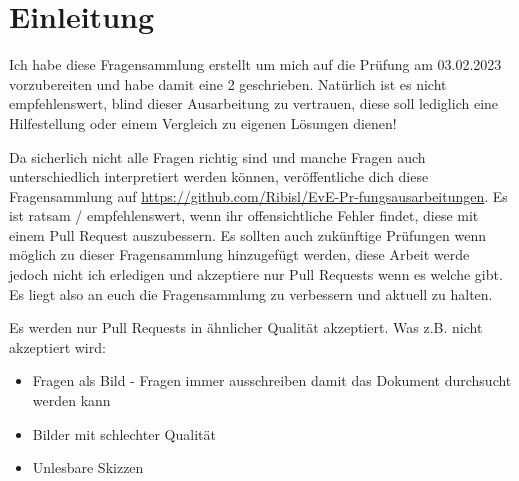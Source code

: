\section{Einleitung}
Ich habe diese Fragensammlung erstellt um mich auf die Prüfung am 03.02.2023 vorzubereiten und habe damit eine 2 geschrieben. 
Natürlich ist es nicht empfehlenswert, blind dieser Ausarbeitung zu vertrauen, diese soll lediglich eine Hilfestellung oder einem Vergleich zu eigenen Lösungen dienen!

Da sicherlich nicht alle Fragen richtig sind und manche Fragen auch unterschiedlich interpretiert werden können, veröffentliche dich diese Fragensammlung
auf \url{https://github.com/Ribisl/EvE-Pr-fungsausarbeitungen}. Es ist ratsam / empfehlenswert, wenn ihr offensichtliche Fehler findet, diese mit einem Pull Request auszubessern.  
Es sollten auch zukünftige Prüfungen wenn möglich zu dieser Fragensammlung hinzugefügt werden, diese Arbeit werde jedoch nicht ich erledigen und akzeptiere nur Pull Requests wenn es
welche gibt. Es liegt also an euch die Fragensammlung zu verbessern und aktuell zu halten.

Es werden nur Pull Requests in ähnlicher Qualität akzeptiert. Was z.B. nicht akzeptiert wird:
\begin{itemize}
    \item Fragen als Bild - Fragen immer ausschreiben damit das Dokument durchsucht werden kann
    \item Bilder mit schlechter Qualität
    \item Unlesbare Skizzen 
\end{itemize}
